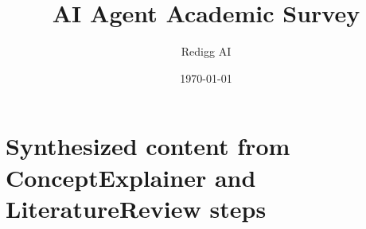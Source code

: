 \documentclass[12pt,a4paper]{article}
\title{AI Agent Academic Survey}
\author{Redigg AI}
\date{\today}
\begin{document}
\maketitle

\section*{Synthesized content from ConceptExplainer and LiteratureReview steps}
\end{document}
